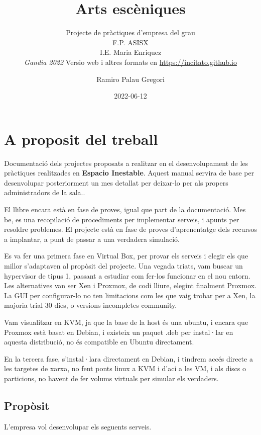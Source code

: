 \documentclass[
  10pt,
]{krantz}
\title{Arts escèniques}
\subtitle{Projecte de pràctiques d'empresa del grau\\
F.P. ASISX\\
I.E. Maria Enriquez\\
\emph{Gandia 2022} Versio web i altres formats en \url{https://incitato.github.io}}
\author{Ramiro Palau Gregori}
\date{2022-06-12}
\begin{document}
\maketitle

{
\hypersetup{linkcolor=}
\setcounter{tocdepth}{2}
\tableofcontents
}
\hypertarget{a-proposit-del-treball}{%
\chapter*{A proposit del treball}\label{a-proposit-del-treball}}


Documentació dels projectes proposats a realitzar en el desenvolupament de les pràctiques realitzades en \textbf{Espacio Inestable}. Aquest manual servira de base per desenvolupar posteriorment un mes detallat per deixar-lo per als propers administradors de la sala..

El llibre encara està en fase de proves, igual que part de la documentació. Mes be, es una recopilació de procediments per implementar serveis, i apunts per resoldre problemes. El projecte està en fase de proves d'aprenentatge dels recursos a implantar, a punt de passar a una verdadera simulació.

Es va fer una primera fase en Virtual Box, per provar els serveis i elegir els que millor s'adaptaven al propòsit del projecte. Una vegada triats, vam buscar un hypervisor de tipus 1, passant a estudiar com fer-los funcionar en el nou entorn. Les alternatives van ser Xen i Proxmox, de codi lliure, elegint finalment Proxmox. La GUI per configurar-lo no ten limitacions com les que vaig trobar per a Xen, la majoria trial 30 dies, o versions incompletes community.

Vam visualitzar en KVM, ja que la base de la host és una ubuntu, i encara que Proxmox està basat en Debian, i existeix un paquet .deb per instal·lar en aquesta distribució, no és compatible en Ubuntu directament.

En la tercera fase, s'instal·lara directament en Debian, i tindrem accés directe a les targetes de xarxa, no fent ponts linux a KVM i d'aci a les VM, i als discs o particions, no havent de fer volums virtuals per simular els verdaders.

\hypertarget{propuxf2sit}{%
\section*{Propòsit}\label{propuxf2sit}}


L'empresa vol desenvolupar els seguents serveis.
\end{document}
